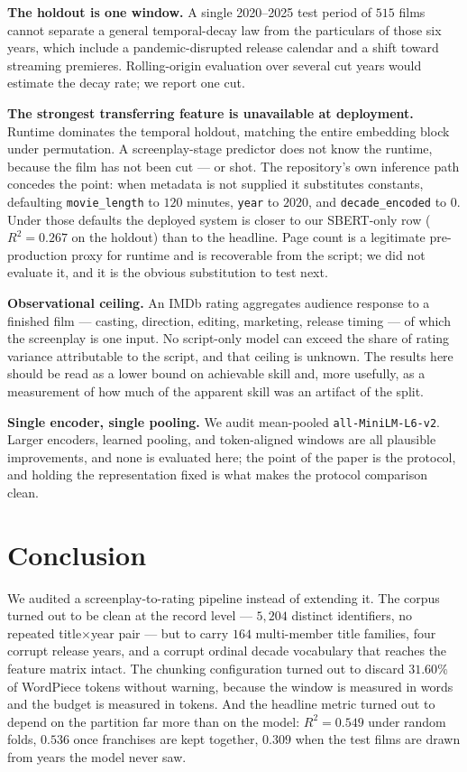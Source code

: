 \documentclass[conference,a4paper]{IEEEtran}
\newcommand{\hlt}[1]{\textbf{#1}}
\begin{document}
\hlt{The holdout is one window.} A single 2020--2025 test period of $515$
films cannot separate a general temporal-decay law from the particulars of
those six years, which include a pandemic-disrupted release calendar and
a shift toward streaming premieres. Rolling-origin evaluation over
several cut years would estimate the decay rate; we report one cut.

\hlt{The strongest transferring feature is unavailable at deployment.}
Runtime dominates the temporal holdout, matching the entire embedding
block under permutation. A screenplay-stage predictor does not know the
runtime, because the film has not been cut --- or shot. The repository's
own inference path concedes the point: when metadata is not supplied it
substitutes constants, defaulting \texttt{movie\_length} to $120$
minutes, \texttt{year} to $2020$, and \texttt{decade\_encoded} to $0$.
Under those defaults the deployed system is closer to our SBERT-only
row ($R^{2} = 0.267$ on the holdout) than to the headline. Page count is
a legitimate pre-production proxy for runtime and is recoverable from the
script; we did not evaluate it, and it is the obvious substitution to
test next.

\hlt{Observational ceiling.} An IMDb rating aggregates audience response
to a finished film --- casting, direction, editing, marketing, release
timing --- of which the screenplay is one input. No script-only model can
exceed the share of rating variance attributable to the script, and that
ceiling is unknown. The results here should be read as a lower bound on
achievable skill and, more usefully, as a measurement of how much of the
apparent skill was an artifact of the split.

\hlt{Single encoder, single pooling.} We audit mean-pooled
\texttt{all-MiniLM-L6-v2}. Larger encoders, learned pooling, and
token-aligned windows are all plausible improvements, and none is
evaluated here; the point of the paper is the protocol, and holding the
representation fixed is what makes the protocol comparison clean.

\section{Conclusion}

We audited a screenplay-to-rating pipeline instead of extending it. The
corpus turned out to be clean at the record level --- $5{,}204$ distinct
identifiers, no repeated title$\times$year pair --- but to carry $164$
multi-member title families, four corrupt release years, and a corrupt
ordinal decade vocabulary that reaches the feature matrix intact. The
chunking configuration turned out to discard $31.60\%$ of WordPiece
tokens without warning, because the window is measured in words and the
budget is measured in tokens. And the headline metric turned out to
depend on the partition far more than on the model: $R^{2} = 0.549$ under
random folds, $0.536$ once franchises are kept together, $0.309$ when the
test films are drawn from years the model never saw.
\end{document}
